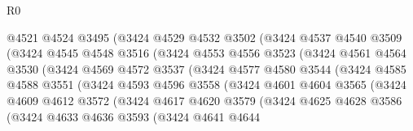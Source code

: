 \begin{lexlean}{R0}
\begin{coremodule}
                      @4521
                      @4524
                      @3495
                      (@3424
                        @4529
                        @4532
                        @3502
                        (@3424
                          @4537
                          @4540
                          @3509
                          (@3424
                            @4545
                            @4548
                            @3516
                            (@3424
                              @4553
                              @4556
                              @3523
                              (@3424
                                @4561
                                @4564
                                @3530
                                (@3424
                                  @4569
                                  @4572
                                  @3537
                                  (@3424
                                    @4577
                                    @4580
                                    @3544
                                    (@3424
                                      @4585
                                      @4588
                                      @3551
                                      (@3424
                                        @4593
                                        @4596
                                        @3558
                                        (@3424
                                          @4601
                                          @4604
                                          @3565
                                          (@3424
                                            @4609
                                            @4612
                                            @3572
                                            (@3424
                                              @4617
                                              @4620
                                              @3579
                                              (@3424
                                                @4625
                                                @4628
                                                @3586
                                                (@3424
                                                  @4633
                                                  @4636
                                                  @3593
                                                  (@3424
                                                    @4641
                                                    @4644

\end{coremodule}
\end{lexlean}
